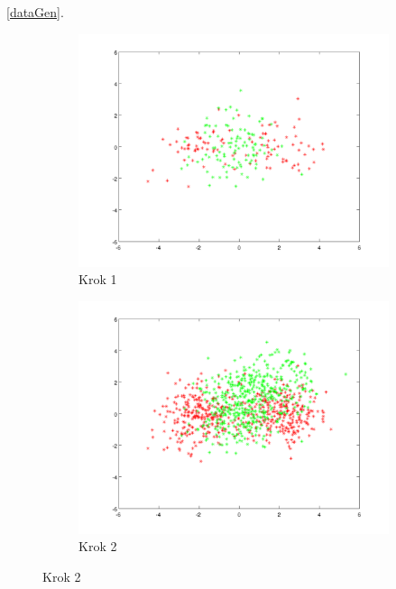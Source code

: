 \documentclass[10pt,a4paper]{article}
\begin{document}
\ref{dataGen}. 
\begin{figure}[H]
  \begin{subfigure}[b]{0.4\textwidth}
    \includegraphics[width=\textwidth]{dataGen2_step0.png}
    \caption{Krok 1}
  \end{subfigure}
  \hfill
  \begin{subfigure}[b]{0.4\textwidth}
    \includegraphics[width=\textwidth]{dataGen2_step1.png}
    \caption{Krok 2}
  \end{subfigure}


\end{figure}
\end{document}
